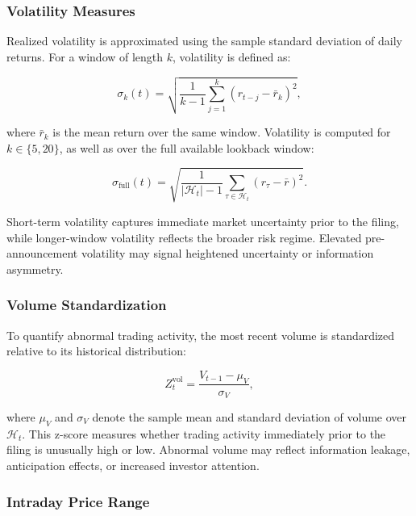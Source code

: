 \subsubsection*{Volatility Measures}

Realized volatility is approximated using the sample standard deviation of daily returns. For a window of length $k$, volatility is defined as:

\begin{equation}
\sigma_k(t) = 
\sqrt{
\frac{1}{k-1}
\sum_{j=1}^{k}
\left(r_{t-j} - \bar{r}_k\right)^2
},
\end{equation}

where $\bar{r}_k$ is the mean return over the same window. Volatility is computed for $k \in \{5, 20\}$, as well as over the full available lookback window:

\begin{equation}
\sigma_{\text{full}}(t) =
\sqrt{
\frac{1}{|\mathcal{H}_t|-1}
\sum_{\tau \in \mathcal{H}_t}
\left(r_\tau - \bar{r}\right)^2
}.
\end{equation}

Short-term volatility captures immediate market uncertainty prior to the filing, while longer-window volatility reflects the broader risk regime. Elevated pre-announcement volatility may signal heightened uncertainty or information asymmetry.

\subsubsection*{Volume Standardization}

To quantify abnormal trading activity, the most recent volume is standardized relative to its historical distribution:

\begin{equation}
Z^{\text{vol}}_t =
\frac{V_{t-1} - \mu_V}{\sigma_V},
\end{equation}

where $\mu_V$ and $\sigma_V$ denote the sample mean and standard deviation of volume over $\mathcal{H}_t$. This z-score measures whether trading activity immediately prior to the filing is unusually high or low. Abnormal volume may reflect information leakage, anticipation effects, or increased investor attention.

\subsubsection*{Intraday Price Range}

